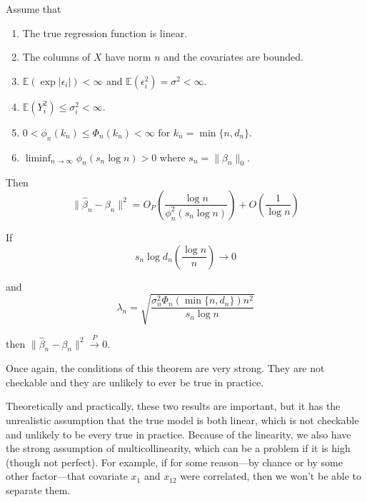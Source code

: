   \begin{theorem}
    \label{thm:consistency-meinshausen-and-yu-2006}
    Assume that
    \begin{enumerate}
      \item The true regression function is linear.
      
      \item The columns of $X$ have norm $n$ and the covariates are bounded.
      
      \item $\mathbb{E}(\exp |\epsilon_i|) < \infty$ and $\mathbb{E}(\epsilon_i^2) = \sigma^2 < \infty$.
      
      \item $\mathbb{E}(Y_i^2) \leq \sigma_i^2 < \infty$.
      
      \item $0 < \phi_n(k_n) \leq \Phi_n(k_n) < \infty$ for $k_n = \min\{n, d_n\}$.
      
      \item $\liminf_{n \to \infty} \phi_n(s_n \log n) > 0$ where $s_n = \|\beta_n\|_0$.
    \end{enumerate}

    Then
    \begin{equation}
      \|\hat{\beta}_n - \beta_n\|^2 = O_P \left( \frac{\log n}{\phi_n^2(s_n \log n)} \right) + O \left( \frac{1}{\log n} \right) 
    \end{equation}

    If
    \begin{equation}
      s_n \log d_n \left( \frac{\log n}{n} \right) \to 0 
    \end{equation}

    and
    \begin{equation}
      \lambda_n = \sqrt{\frac{\sigma_n^2 \Phi_n(\min\{n, d_n\})n^2}{s_n \log n}} 
    \end{equation}

    then $\|\hat{\beta}_n - \beta_n\|^2 \xrightarrow{P} 0$.

    Once again, the conditions of this theorem are very strong. They are not checkable and they are unlikely to ever be true in practice.
  \end{theorem}

  Theoretically and practically, these two results are important, but it has the unrealistic assumption that the true model is both linear, which is not checkable and unlikely to be every true in practice. Because of the linearity, we also have the strong assumption of multicollinearity, which can be a problem if it is high (though not perfect). For example, if for some reason---by chance or by some other factor---that covariate $x_1$ and $x_{12}$ were correlated, then we won't be able to separate them. 

